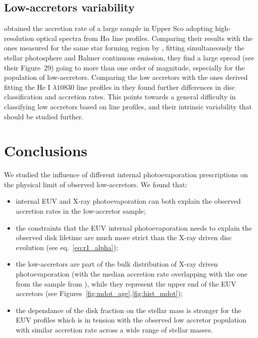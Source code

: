 \documentclass[fleqn,usenatbib,letters]{mnras}
\begin{document}

\subsection{Low-accretors variability}

\citet{Fang2023} obtained the accretion rate of a large sample in Upper Sco adopting high-resolution optical spectra from H$\alpha$ line profiles. Comparing their results with the ones measured for the same star forming region by \citet{Manara2020}, fitting simultaneously the stellar photosphere and Balmer continuous emission, they find a large spread (see their Figure~29) going to more than one order of magnitude, especially for the population of low-accretors. Comparing the low accretors with the ones derived fitting the He I $\lambda10830$ line profiles in \citet{Thanathibodee2023} they found further differences in disc classification and accretion rates. This points towards a general difficulty in classifying low accretors based on line profiles, and their intrinsic variability that should be studied further.

\section{Conclusions}\label{sec:conclusions}

We studied the influence of different internal photoevaporation prescriptions on the physical limit of observed low-accretors. We found that:
\begin{itemize}
  \item internal EUV and X-ray photoevaporation can both explain the observed accretion rates in the low-accretor sample;
  \item the constraints that the EUV internal photoevaporation needs to explain the observed disk lifetime are much more strict than the X-ray driven disc evolution (see eq.~\ref{eq:r1_alpha});
  \item the low-accretors are part of the bulk distribution of X-ray driven photoevaporation (with the median accretion rate overlapping with the one from the sample from \citet{Thanathibodee2023}), while they represent the upper end of the EUV accretors (see Figures~\ref{fig:mdot_age},\ref{fig:hist_mdot});
  \item the dependance of the disk fraction on the stellar mass is stronger for the EUV profiles which is in tension with the observed low accretor population with similar accretion rate across a wide range of stellar masses.
\end{itemize}
\end{document}

